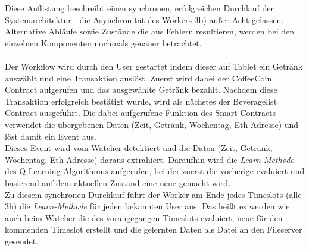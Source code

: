Diese Auflistung beschreibt einen synchronen, erfolgreichen Durchlauf der Systemarchitektur - die Asynchronität des Workers 3b) außer Acht gelassen. Alternative Abläufe sowie Zustände die aus Fehlern resultieren, werden bei den einzelnen Komponenten nochmals genauer betrachtet.\\\\
Der Workflow wird durch den User gestartet indem dieser auf Tablet ein Getränk auswählt und eine Transaktion auslöst. Zuerst wird dabei der CoffeeCoin Contract aufgerufen und das ausgewählte Getränk bezahlt. Nachdem diese Transaktion erfolgreich bestätigt wurde, wird als nächstes der Beveragelist Contract ausgeführt. Die dabei aufgerufene Funktion des Smart Contracts verwendet die übergebenen Daten (Zeit, Getränk, Wochentag, Eth-Adresse) und löst damit ein Event aus. \\
Dieses Event wird vom Watcher detektiert und die Daten (Zeit, Getränk, Wochentag, Eth-Adresse) daraus extrahiert. Daraufhin wird die \textit{Learn-Methode} des Q-Learning Algorithmus aufgerufen, bei der zuerst die vorherige  evaluiert und basierend auf dem aktuellen Zustand eine neue  gemacht wird. \\
Zu diesem synchronen Durchlauf führt der Worker am Ende jedes Timeslots (alle 3h) die \textit{Learn-Methode} für jeden bekannten User aus. Das heißt es werden wie auch beim Watcher die  des vorangegangen Timeslots evaluiert, neue  für den kommenden Timeslot erstellt und die gelernten Daten als Datei an den Fileserver gesendet.

\clearpage

